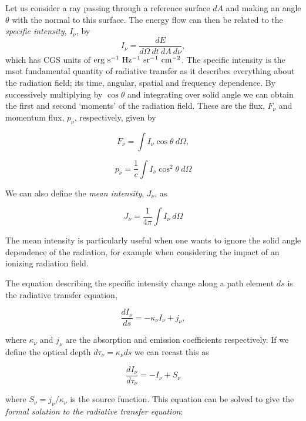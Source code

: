 Let us consider a ray passing through a reference surface $dA$ and 
making an angle $\theta$ with the normal to this surface. The energy
flow can then be related to the
{\em specific intensity}, $I_\nu$, by
\begin{equation}
I_\nu = \frac{dE}{d\Omega~dt~dA~d\nu},
\end{equation}
which has CGS units of ${\rm erg~s^{-1}~Hz^{-1}~sr^{-1}~cm^{-2}}$. The specific
intensity is the msot fundamental quantity of radiative transfer as it describes 
everything about the radiation field; its time, angular, spatial and frequency
dependence.
By successively multiplying by $\cos \theta$ and integrating over solid angle we 
can obtain the first and second `moments' of the radiation field. These
are the flux, $F_\nu$ and momentum flux, $p_\nu$, respectively, given by

\begin{equation}
F_\nu = \int I_\nu \cos \theta~d \Omega,
\end{equation}

\begin{equation}
p_\nu = \frac{1}{c} \int I_\nu \cos^2 \theta~d \Omega
\end{equation}

We can also define the {\em mean intensity}, $J_\nu$, as

\begin{equation}
J_\nu = \frac{1}{4 \pi} \int I_\nu~d \Omega
\end{equation}

The mean intensity is particularly
useful when one wants to ignore the solid angle dependence of the radiation,
for example when considering the impact of an ionizing radiation field.

The equation describing the specific intensity change along a path element $ds$
is the radiative transfer equation, 

\begin{equation}
\frac{d I_\nu}{ds} = -\kappa_\nu I_\nu + j_\nu, 
\end{equation}

where $\kappa_\nu$ and $j_\nu$ are the absorption and emission coefficients respectively.
If we define the optical depth $d \tau_\nu = \kappa_\nu ds$ we can recast this as

\begin{equation}
\frac{d I_\nu}{d \tau_\nu} = -I_\nu + S_\nu
\label{eq:formal_rte}
\end{equation}

where $S_\nu=j_\nu/\kappa_\nu$ is the source function. This equation
can be solved to give the {\em formal solution to the radiative transfer equation}:

